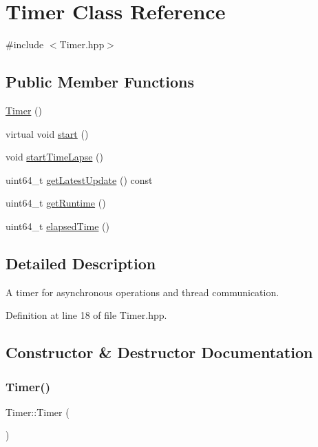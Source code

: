 \hypertarget{classTimer}{}\section{Timer Class Reference}
\label{classTimer}


{\ttfamily \#include $<$Timer.\+hpp$>$}

\subsection*{Public Member Functions}
\begin{DoxyCompactItemize}
\item 
\mbox{\hyperlink{classTimer_a5f16e8da27d2a5a5242dead46de05d97}{Timer}} ()
\item 
virtual void \mbox{\hyperlink{classTimer_ad56fbc8001f1dc6a0585290a46af8a92}{start}} ()
\item 
void \mbox{\hyperlink{classTimer_ac293413e966e4505b0cc20d47d5f1888}{start\+Time\+Lapse}} ()
\item 
uint64\+\_\+t \mbox{\hyperlink{classTimer_a6b30feb3bdee579e8458cb4eb098fdfa}{get\+Latest\+Update}} () const
\item 
uint64\+\_\+t \mbox{\hyperlink{classTimer_a8aa7e2c2d1a2321508f6b96a53cddcef}{get\+Runtime}} ()
\item 
uint64\+\_\+t \mbox{\hyperlink{classTimer_aafb10e82384de08110059720281c4030}{elapsed\+Time}} ()
\end{DoxyCompactItemize}


\subsection{Detailed Description}
A timer for asynchronous operations and thread communication. 

Definition at line 18 of file Timer.\+hpp.



\subsection{Constructor \& Destructor Documentation}
\mbox{\label{classTimer_a5f16e8da27d2a5a5242dead46de05d97}} 
\subsubsection{\texorpdfstring{Timer()}{Timer()}}
{\footnotesize\ttfamily Timer\+::\+Timer (\begin{DoxyParamCaption}{ }\end{DoxyParamCaption})\hspace{0.3cm}{\ttfamily [inline]}}

